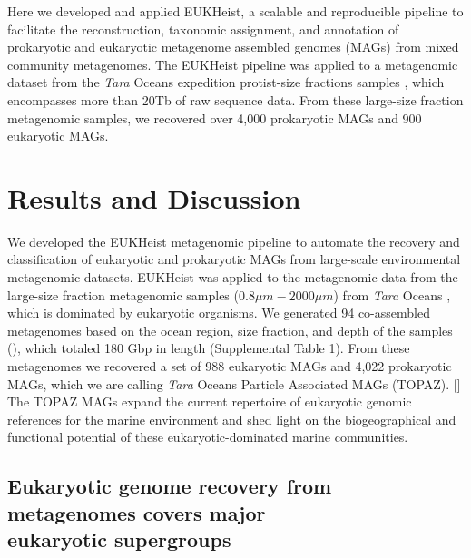 \documentclass[12pt]{article}
\numberwithin{equation}{section}
\begin{document}
Here we developed and applied EUKHeist, a scalable and reproducible pipeline to facilitate the reconstruction, taxonomic assignment, and annotation of prokaryotic and eukaryotic metagenome assembled genomes (MAGs) from mixed community metagenomes. The EUKHeist pipeline was applied to a metagenomic dataset from the \textit{Tara} Oceans expedition protist-size fractions samples \citep{Carradec2018global}, which encompasses more than 20Tb of raw sequence data. From these large-size fraction metagenomic samples, we recovered over 4,000 prokaryotic MAGs and 900 eukaryotic MAGs. 

\section*{Results and Discussion}

We developed the EUKHeist metagenomic pipeline to automate the recovery and classification of eukaryotic and prokaryotic MAGs from large-scale environmental metagenomic datasets. EUKHeist was applied to the metagenomic data from the large-size fraction metagenomic samples ($0.8\mu m-2000\mu m$)  from \textit{Tara} Oceans \citep{Carradec2018global}, which is dominated by eukaryotic organisms. We generated 94 co-assembled metagenomes based on the ocean region, size fraction, and depth of the samples (), which totaled 180 Gbp in length (Supplemental Table 1).  From these metagenomes we recovered a set of 988 eukaryotic MAGs and 4,022 prokaryotic MAGs, which we are calling \textit{Tara} Oceans Particle Associated MAGs (TOPAZ). [] The TOPAZ MAGs expand the current repertoire of eukaryotic genomic references for the marine environment and shed light on the biogeographical and functional potential of these eukaryotic-dominated marine communities. 

\subsection*{Eukaryotic genome recovery from metagenomes covers major \\ eukaryotic supergroups}
\end{document}
